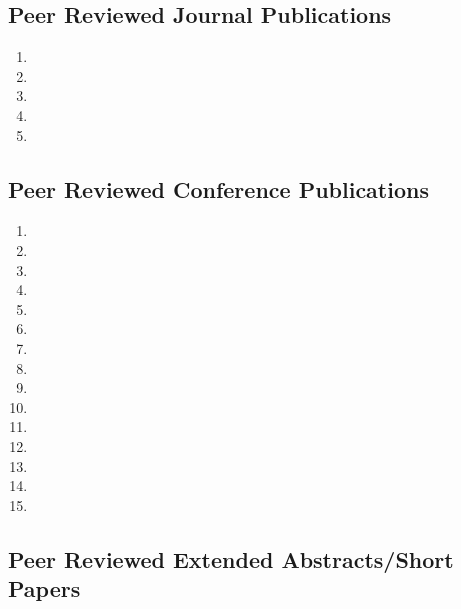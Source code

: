 
\hypertarget{peer-reviewed-journal-publications}{%
\subsection{Peer Reviewed Journal
Publications}\label{peer-reviewed-journal-publications}}

\begin{enumerate}
\tightlist
\item {}
\item {}
\item {}
\item {}
\item {}
\end{enumerate}

\hypertarget{peer-reviewed-conference-publications}{%
\subsection{Peer Reviewed Conference
Publications}\label{peer-reviewed-conference-publications}}

\begin{enumerate}[resume]
\tightlist
\item {}
\item {}
\item {}
\item {}
\item {}
\item {}
\item {}
\item {}
\item {}
\item {}
\item {}
\item {}
\item {}
\item {}
\item {}
\end{enumerate}

\hypertarget{peer-reviewed-extended-abstractsshort-papers}{%
\subsection{Peer Reviewed Extended Abstracts/Short
Papers}\label{peer-reviewed-extended-abstractsshort-papers}}

